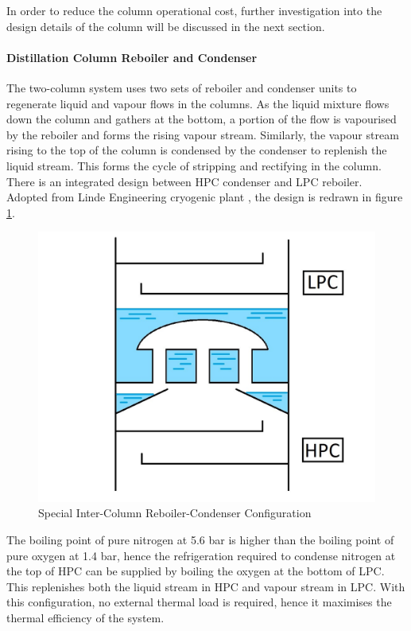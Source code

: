\documentclass[11pt,oneside]{article}
\let\subsubsubsection\paragraph
\begin{document}
        In order to reduce the column operational cost, further investigation into the design details of the column will be discussed in the next section.
		\subsubsubsection{Distillation Column Reboiler and Condenser}
		The two-column system uses two sets of reboiler and condenser units to regenerate liquid and vapour flows in the columns. As the liquid mixture flows down the column and gathers at the bottom, a portion of the flow is vapourised by the reboiler and forms the rising vapour stream. Similarly, the vapour stream rising to the top of the column is condensed by the condenser to replenish the liquid stream. This forms the cycle of stripping and rectifying in the column. \\
		
	    \noindent There is an integrated design between HPC condenser and LPC reboiler. Adopted from Linde Engineering cryogenic plant \citep{linde_cryo}, the design is redrawn in figure \ref{reboiler-condenser_diagram}. \\
		\begin{figure}[H]
		    \centering
		    \includegraphics[scale=0.3]{reboiler-condenser_diagram.jpg}
		    \caption{Special Inter-Column Reboiler-Condenser Configuration}
		    \label{reboiler-condenser_diagram}
		\end{figure}
	    \noindent The boiling point of pure nitrogen at 5.6 bar is higher than the boiling point of pure oxygen at 1.4 bar, hence the refrigeration required to condense nitrogen at the top of HPC can be supplied by boiling the oxygen at the bottom of LPC. This replenishes both the liquid stream in HPC and vapour stream in LPC. With this configuration, no external thermal load is required, hence it maximises the thermal efficiency of the system. \\
\end{document}
